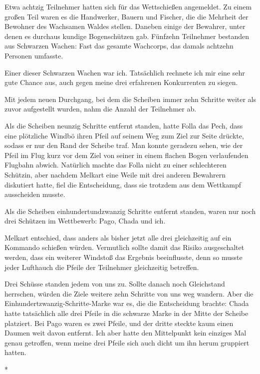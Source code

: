 \documentclass[10pt, a4paper, oneside]{book}
\begin{document}
\begin{multicols}{2}
Etwa achtzig Teilnehmer hatten sich für das Wettschießen angemeldet. Zu einem großen Teil waren es die Handwerker, Bauern und Fischer, die die Mehrheit der Bewohner des Wachsamen Waldes stellen. Daneben einige der Bewahrer, unter denen es durchaus kundige Bogenschützen gab. Fünfzehn Teilnehmer bestanden aus Schwarzen Wachen: Fast das gesamte Wachcorps, das damals achtzehn Personen umfasste.

Einer dieser Schwarzen Wachen war ich. Tatsächlich rechnete ich mir eine sehr gute Chance aus, auch gegen meine drei erfahrenen Konkurrenten zu siegen.

Mit jedem neuen Durchgang, bei dem die Scheiben immer zehn Schritte weiter als zuvor aufgestellt wurden, nahm die Anzahl der Teilnehmer ab. 

Als die Scheiben neunzig Schritte entfernt standen, hatte Folla das Pech, dass eine plötzliche Windbö ihren Pfeil auf seinem Weg zum Ziel zur Seite drückte, sodass er nur den Rand der Scheibe traf. Man konnte geradezu sehen, wie der Pfeil im Flug kurz vor dem Ziel von seiner in einem flachen Bogen verlaufenden Flugbahn abwich. Natürlich machte das Folla nicht zu einer schlechteren Schützin, aber nachdem Melkart eine Weile mit drei anderen Bewahrern diskutiert hatte, fiel die Entscheidung, dass sie trotzdem aus dem Wettkampf ausscheiden musste.

Als die Scheiben einhundertundzwanzig Schritte entfernt standen, waren nur noch drei Schützen im Wettbewerb: Pago, Chada und ich.

Melkart entschied, dass anders als bisher jetzt alle drei gleichzeitig auf ein Kommando schießen würden. Vermutlich sollte damit das Risiko ausgeschaltet werden, dass ein weiterer Windstoß das Ergebnis beeinflusste, denn so musste jeder Lufthauch die Pfeile der Teilnehmer gleichzeitig betreffen.

Drei Schüsse standen jedem von uns zu. Sollte danach noch Gleichstand herrschen, würden die Ziele weitere zehn Schritte von uns weg wandern. Aber die Einhundertzwanzig-Schritte-Marke war es, die die Entscheidung brachte: Chada hatte tatsächlich alle drei Pfeile in die schwarze Marke in der Mitte der Scheibe platziert. Bei Pago waren es zwei Pfeile, und der dritte steckte kaum einen Daumen weit davon entfernt. Ich aber hatte den Mittelpunkt kein einziges Mal genau getroffen, wenn meine drei Pfeile sich auch dicht um ihn herum gruppiert hatten.

\begin{center}
    *
\end{center}


\end{multicols}
\end{document}
